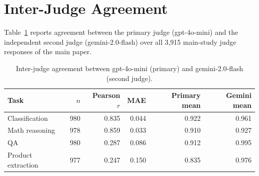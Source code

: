 \section{Inter-Judge Agreement}
\label{app:judge-agreement}

Table~\ref{tab:judge} reports agreement between the primary judge (gpt-4o-mini)
and the independent second judge (gemini-2.0-flash) over all 3,915 main-study
judge responses of the main paper.

\begin{table}[h]
\centering
\caption{Inter-judge agreement between gpt-4o-mini (primary) and
  gemini-2.0-flash (second judge).}
\label{tab:judge}
\small
\begin{tabular}{lrrrrr}
\toprule
Task & $n$ & Pearson $r$ & MAE & Primary mean & Gemini mean \\
\midrule
Classification      & 980 & 0.835 & 0.044 & 0.922 & 0.961 \\
Math reasoning      & 978 & 0.859 & 0.033 & 0.910 & 0.927 \\
QA                  & 980 & 0.287 & 0.086 & 0.912 & 0.995 \\
Product extraction  & 977 & 0.247 & 0.150 & 0.835 & 0.976 \\
\bottomrule
\end{tabular}
\end{table}
